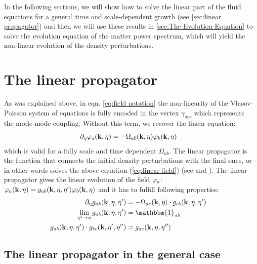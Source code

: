 In the following sections, we will show how to solve the linear part of
the fluid equations for a general time and scale-dependent growth (see \cref{sec:linear propagator})
and then we will use these results in \cref{sec:The-Evolution-Equation} to solve the evolution equation of the 
matter power spectrum, which will yield the non-linear evolution
of the density perturbations.


\section{The linear propagator \label{sec:linear propagator}}

As was explained above, in eqn. \ref{eq:field notation} the non-linearity
of the Vlasov-Poisson system of equations is fully encoded in the
vertex $\gamma_{abc}$ which represents the mode-mode coupling. Without
this term, we recover the linear equation:
\begin{equation}
\partial_{\eta}\varphi_{a}(\mathbf{k},\eta)=-\Omega_{ab}(\mathbf{k},\eta)\varphi_{b}(\mathbf{k},\eta) \label{eq:linear-field}
\end{equation}
which is valid for a fully scale and time dependent $\Omega_{ab}$. 
The linear propagator is the function that connects the initial
density perturbations with the final ones, or in other words solves
the above equation (\ref{eq:linear-field}) (see \cite{scoccimarro_redshift-space_2004} and \cite{anselmi_nonlinear_2012}).
The linear propagator gives the linear
evolution of the field $\varphi_{a}$:
\beeqc$ 
\varphi_{a}(\mathbf{k},\eta)=g_{ab}(\mathbf{k},\eta,\eta')\varphi_{b}(\mathbf{k},\eta)
$
and it has to fulfill following properties:
\begin{align*}
\pet g_{ab}(\vk k,\eta,\eta') & =-\Omega_{ac}\pkn\cdot g_{cb}(\vk k,\eta,\eta')\\
\lim_{\eta'\rightarrow\eta}g_{ab}(\vk k,\eta,\eta') & =\mathbbm{1}_{ab}\\
g_{ab}(\vk k,\eta,\eta')\cdot g_{bc}(\vk k,\eta',\eta'') & =g_{ac}(\vk k,\eta,\eta'')
\end{align*}

\subsection{The linear propagator in the general case}

